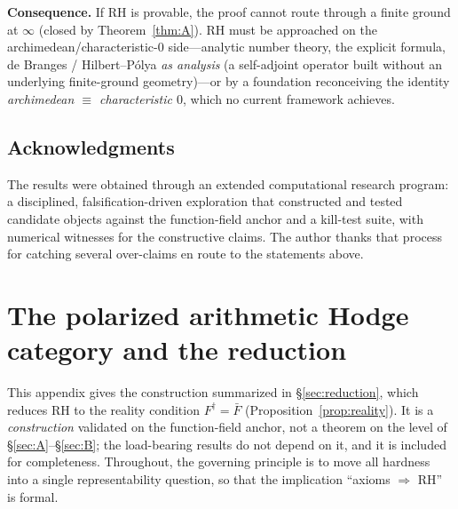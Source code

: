 \documentclass[11pt,reqno]{amsart}
\theoremstyle{plain}
\theoremstyle{definition}
\theoremstyle{remark}
\newcommand{\dg}{^{\dagger}}
\begin{document}
\noindent\textbf{Consequence.} If RH is provable, the proof cannot route through a finite ground at $\infty$
(closed by Theorem~\ref{thm:A}). RH must be approached on the archimedean/characteristic-$0$ side---analytic
number theory, the explicit formula, de Branges / Hilbert--P\'olya \emph{as analysis} (a self-adjoint
operator built without an underlying finite-ground geometry)---or by a foundation reconceiving the identity
\emph{archimedean $\equiv$ characteristic $0$}, which no current framework achieves.

\subsection*{Acknowledgments}
The results were obtained through an extended computational research program: a disciplined,
falsification-driven exploration that constructed and tested candidate objects against the function-field
anchor and a kill-test suite, with numerical witnesses for the constructive claims. The author thanks that
process for catching several over-claims en route to the statements above.

\appendix

\section{The polarized arithmetic Hodge category and the reduction}\label{app:construction}

This appendix gives the construction summarized in \S\ref{sec:reduction}, which reduces RH to the reality
condition $F\dg=\bar F$ (Proposition~\ref{prop:reality}). It is a \emph{construction} validated on the
function-field anchor, not a theorem on the level of \S\ref{sec:A}--\S\ref{sec:B}; the load-bearing results
do not depend on it, and it is included for completeness. Throughout, the governing principle is to move all
hardness into a single representability question, so that the implication ``axioms $\Rightarrow$ RH'' is
formal.
\end{document}
